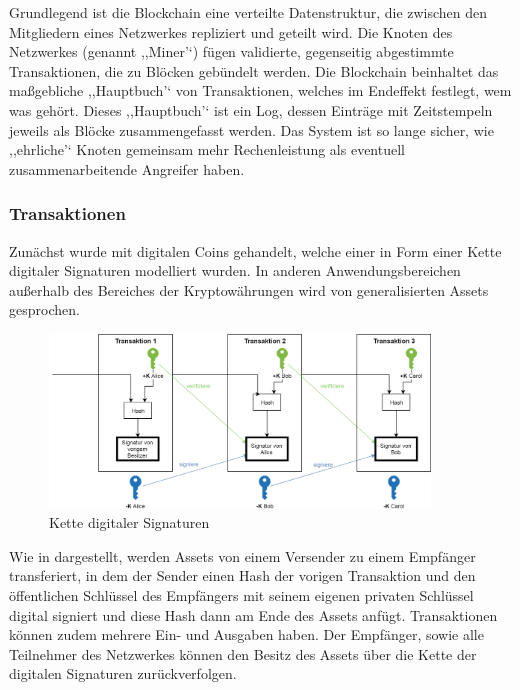     \noindent Grundlegend ist die Blockchain eine verteilte Datenstruktur, die zwischen den Mitgliedern eines Netzwerkes repliziert und geteilt wird\cite{Christidis2016}.
    Die Knoten des Netzwerkes (genannt ,,Miner'`) fügen validierte, gegenseitig abgestimmte Transaktionen, die zu Blöcken gebündelt werden.
    Die Blockchain beinhaltet das maßgebliche ,,Hauptbuch'` von Transaktionen, welches im Endeffekt festlegt, wem was gehört.
    Dieses ,,Hauptbuch'` ist ein Log, dessen Einträge mit Zeitstempeln jeweils als Blöcke zusammengefasst werden.
    Das System ist so lange sicher, wie ,,ehrliche'` Knoten gemeinsam mehr Rechenleistung als eventuell zusammenarbeitende Angreifer haben\cite{Nakamoto2008}.
    
    \subsubsection{Transaktionen}
    \label{sec:sota_blockchain_trx}
	    Zunächst wurde mit digitalen Coins gehandelt, welche einer in Form einer Kette digitaler Signaturen modelliert wurden\cite{Nakamoto2008}.
	    In anderen Anwendungsbereichen außerhalb des Bereiches der Kryptowährungen wird von generalisierten Assets gesprochen.
	    \begin{figure}[H]
	    	\centering
	    	\includegraphics[width=0.9\textwidth]{graphics/transaction.png}
	    	\caption{Kette digitaler Signaturen}
	    	\label{fig:txio}
	    \end{figure}
    
	    Wie in  dargestellt, werden Assets von einem Versender zu einem Empfänger transferiert, in dem der Sender einen Hash der vorigen Transaktion und den öffentlichen Schlüssel des Empfängers mit seinem eigenen privaten Schlüssel digital signiert und diese Hash dann am Ende des Assets anfügt.
	    Transaktionen können zudem mehrere Ein- und Ausgaben haben\cite{Nakamoto2008}.
	    Der Empfänger, sowie alle Teilnehmer des Netzwerkes können den Besitz des Assets über die Kette der digitalen Signaturen zurückverfolgen\cite{Nakamoto2008}.
    

